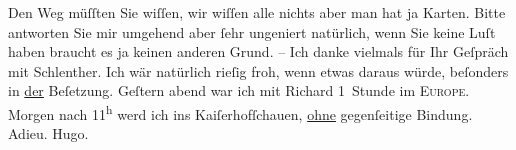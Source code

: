 \begin{ledgroupsized}[t]{13cm}
           \pstart
           Den Weg müſſten Sie wiſſen, wir wiſſen alle nichts aber man hat ja Karten. Bitte
                    antworten Sie mir umgehend aber ſehr ungeniert natürlich, wenn Sie keine Luſt
                    haben braucht es ja keinen anderen Grund. – Ich danke vielmals {\pb}für Ihr Geſpräch mit
                        Schlenther. Ich wär natürlich rieſig
                    froh, wenn etwas daraus würde, beſonders in \uline{der}
                    Beſetzung.\pend
           \pstart
           Geſtern abend war ich mit Richard 1 Stunde im
                        \textsc{Europe}.\pend
           \pstart
           Morgen nach 11\textsuperscript{h} werd ich ins Kaiſerhofſchauen,
                        \uline{ohne} gegenſeitige Bindung. Adieu.\pend
           \pstart \spacefill\mbox{Hugo.}\pend{}
         
         \endnumbering{}\end{ledgroupsized}  \newcommand{\dateiname}{L00792}\newcommand{\titel}{Hugo von Hofmannsthal an Arthur Schnitzler, [19. 4. 1898]}\newcommand{\editorInnen}{Martin Anton Müller und Gerd-Hermann Susen}
      
